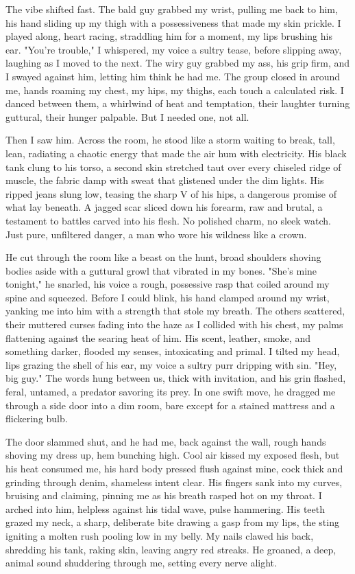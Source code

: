 \documentclass[12pt,oneside]{book} %
\begin{document}
The vibe shifted fast. The bald guy grabbed my wrist, pulling me back to him, his hand sliding up my thigh with a possessiveness that made my skin prickle. I played along, heart racing, straddling him for a moment, my lips brushing his ear. "You’re trouble," I whispered, my voice a sultry tease, before slipping away, laughing as I moved to the next. The wiry guy grabbed my ass, his grip firm, and I swayed against him, letting him think he had me. The group closed in around me, hands roaming my chest, my hips, my thighs, each touch a calculated risk. I danced between them, a whirlwind of heat and temptation, their laughter turning guttural, their hunger palpable. But I needed one, not all.

Then I saw him. Across the room, he stood like a storm waiting to break, tall, lean, radiating a chaotic energy that made the air hum with electricity. His black tank clung to his torso, a second skin stretched taut over every chiseled ridge of muscle, the fabric damp with sweat that glistened under the dim lights. His ripped jeans slung low, teasing the sharp V of his hips, a dangerous promise of what lay beneath. A jagged scar sliced down his forearm, raw and brutal, a testament to battles carved into his flesh. No polished charm, no sleek watch. Just pure, unfiltered danger, a man who wore his wildness like a crown.

He cut through the room like a beast on the hunt, broad shoulders shoving bodies aside with a guttural growl that vibrated in my bones. "She’s mine tonight," he snarled, his voice a rough, possessive rasp that coiled around my spine and squeezed. Before I could blink, his hand clamped around my wrist, yanking me into him with a strength that stole my breath. The others scattered, their muttered curses fading into the haze as I collided with his chest, my palms flattening against the searing heat of him. His scent, leather, smoke, and something darker, flooded my senses, intoxicating and primal. I tilted my head, lips grazing the shell of his ear, my voice a sultry purr dripping with sin. "Hey, big guy." The words hung between us, thick with invitation, and his grin flashed, feral, untamed, a predator savoring its prey. In one swift move, he dragged me through a side door into a dim room, bare except for a stained mattress and a flickering bulb.

The door slammed shut, and he had me, back against the wall, rough hands shoving my dress up, hem bunching high. Cool air kissed my exposed flesh, but his heat consumed me, his hard body pressed flush against mine, cock thick and grinding through denim, shameless intent clear. His fingers sank into my curves, bruising and claiming, pinning me as his breath rasped hot on my throat. I arched into him, helpless against his tidal wave, pulse hammering. His teeth grazed my neck, a sharp, deliberate bite drawing a gasp from my lips, the sting igniting a molten rush pooling low in my belly. My nails clawed his back, shredding his tank, raking skin, leaving angry red streaks. He groaned, a deep, animal sound shuddering through me, setting every nerve alight.
\end{document}
